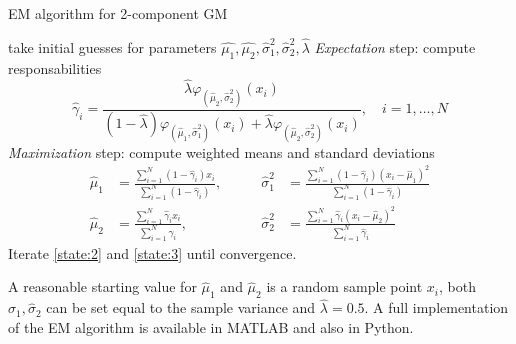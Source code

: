 \begin{algorithm}[H]
	\caption{\gls{EM} algorithm for 2-component GM}
	\begin{algorithmic}[1]
		\State take initial guesses for parameters $\widehat{\mu_1},\widehat{\mu_2},\widehat{\sigma}^2_1,\widehat{\sigma}^2_2, \widehat{\lambda}$
		\State\label{state:2} \textit{Expectation} step:  compute responsabilities
		\[ \widehat{\gamma}_i = \dfrac{\widehat{\lambda}\varphi_{(\widehat{\mu}_2,\widehat{\sigma}^2_2)}(x_i)}{(1-\widehat{\lambda})\varphi_{(\widehat{\mu}_1,\widehat{\sigma}^2_1)}(x_i) + \widehat{\lambda}\varphi_{(\widehat{\mu}_2,\widehat{\sigma}^2_2)}(x_i)},\quad i=1,\ldots,N  \]
		\State\label{state:3} \textit{Maximization} step: compute weighted means and standard deviations
		\begin{align*}
		\widehat{\mu}_1 & = \frac{\sum_{i=1}^{N}(1-\widehat{\gamma}_i)x_i}{\sum_{i=1}^{N}(1-\widehat{\gamma}_i)}, \qquad & \widehat{\sigma}^2_1 & = \frac{\sum_{i=1}^{N}(1-\widehat{\gamma}_i)(x_i-\widehat{\mu}_1)^2}{\sum_{i=1}^{N}(1-\widehat{\gamma}_i)}\\
		\widehat{\mu}_2 & = \frac{\sum_{i=1}^{N}\widehat{\gamma}_ix_i}{\sum_{i=1}^{N}\widehat{\gamma}_i}, \qquad & \widehat{\sigma}^2_2 & = \frac{\sum_{i=1}^{N}\widehat{\gamma}_i(x_i-\widehat{\mu}_2)^2}{\sum_{i=1}^{N}\widehat{\gamma}_i}
		\end{align*}
		\State Iterate \ref{state:2} and \ref{state:3} until convergence.
	\end{algorithmic}
\end{algorithm}
A reasonable starting value for $\widehat{\mu}_1$ and $\widehat{\mu}_2$ is a random sample point $x_i$, both $\widehat{\sigma}_1, \widehat{\sigma}_2$ can be set equal to the sample variance and $\widehat{\lambda} = 0.5$. A full implementation of the EM algorithm is available in MATLAB and also in Python.

